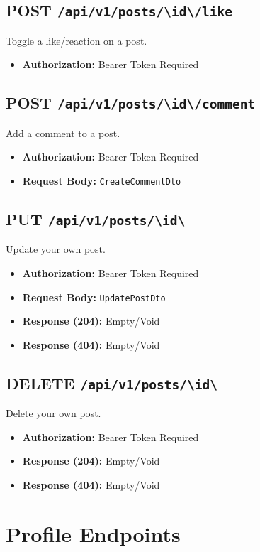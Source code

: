 \subsection{POST \texttt{/api/v1/posts/\textbackslash{}{id\textbackslash{}}/like}}
Toggle a like/reaction on a post.
\begin{itemize}
    \item \textbf{Authorization:} Bearer Token Required
\end{itemize}

\subsection{POST \texttt{/api/v1/posts/\textbackslash{}{id\textbackslash{}}/comment}}
Add a comment to a post.
\begin{itemize}
    \item \textbf{Authorization:} Bearer Token Required
    \item \textbf{Request Body:} \texttt{CreateCommentDto}
\end{itemize}

\subsection{PUT \texttt{/api/v1/posts/\textbackslash{}{id\textbackslash{}}}}
Update your own post.
\begin{itemize}
    \item \textbf{Authorization:} Bearer Token Required
    \item \textbf{Request Body:} \texttt{UpdatePostDto}
    \item \textbf{Response (204):} Empty/Void
    \item \textbf{Response (404):} Empty/Void
\end{itemize}

\subsection{DELETE \texttt{/api/v1/posts/\textbackslash{}{id\textbackslash{}}}}
Delete your own post.
\begin{itemize}
    \item \textbf{Authorization:} Bearer Token Required
    \item \textbf{Response (204):} Empty/Void
    \item \textbf{Response (404):} Empty/Void
\end{itemize}

\section{Profile Endpoints}

